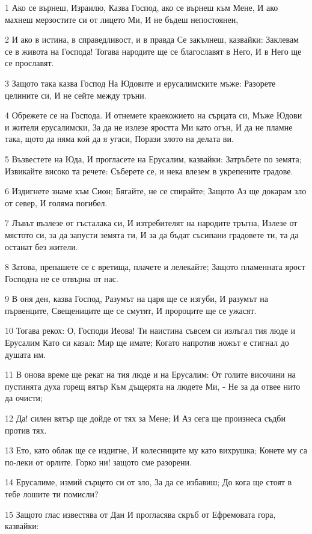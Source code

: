 \par 1 Ако се върнеш, Израилю, Казва Господ, ако се върнеш към Мене, И ако махнеш мерзостите си от лицето Ми, И не бъдеш непостоянен,
\par 2 И ако в истина, в справедливост, и в правда Се закълнеш, казвайки: Заклевам се в живота на Господа! Тогава народите ще се благославят в Него, И в Него ще се прославят.
\par 3 Защото така казва Господ На Юдовите и ерусалимските мъже: Разорете целините си, И не сейте между тръни.
\par 4 Обрежете се на Господа. И отнемете краекожието на сърцата си, Мъже Юдови и жители ерусалимски, За да не излезе яростта Ми като огън, И да не пламне така, щото да няма кой да я угаси, Порази злото на делата ви.
\par 5 Възвестете на Юда, И прогласете на Ерусалим, казвайки: Затръбете по земята; Извикайте високо та речете: Съберете се, и нека влезем в укрепените градове.
\par 6 Издигнете знаме към Сион; Бягайте, не се спирайте; Защото Аз ще докарам зло от север, И голяма погибел.
\par 7 Лъвът възлезе от гъсталака си, И изтребителят на народите тръгна, Излезе от мястото си, за да запусти земята ти, И за да бъдат съсипани градовете ти, та да останат без жители.
\par 8 Затова, препашете се с вретища, плачете и лелекайте; Защото пламенната ярост Господна не се отвърна от нас.
\par 9 В оня ден, казва Господ, Разумът на царя ще се изгуби, И разумът на първенците, Свещениците ще се смутят, И пророците ще се ужасят.
\par 10 Тогава рекох: О, Господи Иеова! Ти наистина съвсем си излъгал тия люде и Ерусалим Като си казал: Мир ще имате; Когато напротив ножът е стигнал до душата им.
\par 11 В онова време ще рекат на тия люде и на Ерусалим: От голите височини на пустинята духа горещ вятър Към дъщерята на людете Ми, - Не за да отвее нито да очисти;
\par 12 Да! силен вятър ще дойде от тях за Мене; И Аз сега ще произнеса съдби против тях.
\par 13 Ето, като облак ще се издигне, И колесниците му като вихрушка; Конете му са по-леки от орлите. Горко ни! защото сме разорени.
\par 14 Ерусалиме, измий сърцето си от зло, За да се избавиш; До кога ще стоят в тебе лошите ти помисли?
\par 15 Защото глас известява от Дан И прогласява скръб от Ефремовата гора, казвайки:
